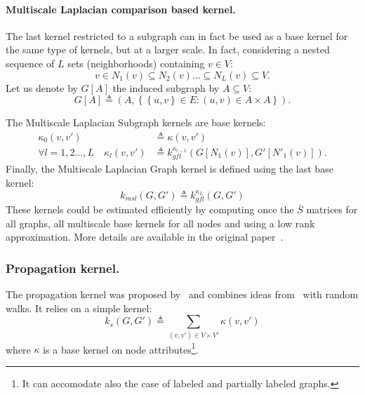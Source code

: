             \paragraph{Multiscale Laplacian comparison based kernel.}
                The last kernel restricted to a subgraph can in fact be used as a base kernel for the same type of kernels, but at a larger scale.
                In fact, considering a nested sequence of $L$ sets (neighborhoods) containing $v \in V$:
                \begin{equation}
                    \label{eq::centered_nested_subgraphs}
                    v \in N_1(v) \subseteq N_2(v) \dots \subseteq N_L(v) \subseteq V.
                \end{equation}
                Let us denote by $G[A]$ the induced subgraph by $A \subseteq V$:
                \begin{equation}
                    \label{eq::induced_subgraph}
                    G[A] \triangleq (A, \left\{\left\{u, v\right\} \in E: (u, v) \in A \times A \right\}).
                \end{equation}
                
                The Multiscale Laplacian Subgraph kernels are base kernels:
                \begin{align}
                    \kappa_0(v, v') &\triangleq \kappa(v, v')\\
                    \forall l = 1, 2\dots,L \quad \kappa_l(v, v') &\triangleq k^{\kappa_{l-1}}_{gfl}\left(G[N_1(v)], G'[N'_1(v)]\right).
                \end{align}
                Finally, the Multiscale Laplacian Graph kernel is defined using the last base kernel:
                \begin{equation}
                    \label{eq::multiscale_laplacian_kernel}
                    k_{msl}(G, G') \triangleq k^{\kappa_L}_{gfl}(G, G')
                \end{equation}
                These kernels could be estimated efficiently by computing once the $\bar{S}$ matrices for all graphs, all multiscale base kernels for all nodes and using a low rank approximation.
                More details are available in the original paper~\parencite{kondor2016multiscale}.

        \subsubsection{Propagation kernel.}
            The propagation kernel was proposed by~\parencite{neumann2016propagation} and combines ideas from~\parencite{shervashidze2011weisfeiler} with random walks.
            It relies on a simple kernel:
            \begin{equation}
                \label{eq::simple_kernel}
                k_s(G, G') \triangleq \sum_{(v, v') \in V\times V'} \kappa(v, v')
            \end{equation}
            where $\kappa$ is a base kernel on node attributes\footnote{It can accomodate also the case of labeled and partially labeled graphs.}.\\
            
